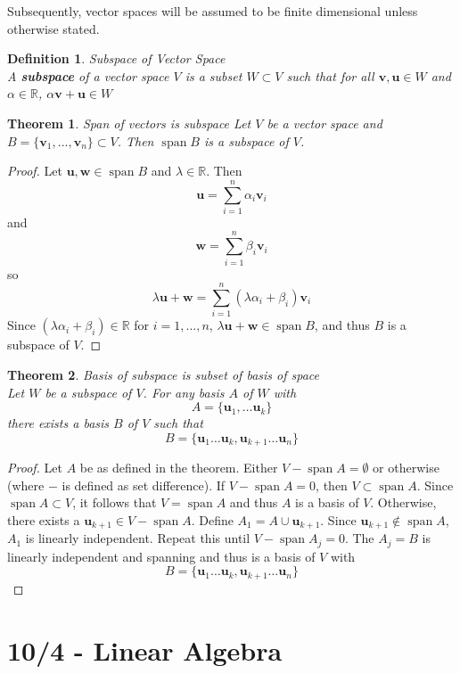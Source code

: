 \documentclass[12pt]{article}
\newtheorem{thm}{Theorem}[section] %
\theoremstyle{plain}
\newtheorem{definition}{Definition}[section]
\newcommand{\R}{\mathbb{R}}
\DeclareMathOperator{\spn}{span}
\newcommand{\vv}{\mathbf{v}}
\newcommand{\vu}{\mathbf{u}}
\newcommand{\vw}{\mathbf{w}}
\begin{document}
    Subsequently, vector spaces will be assumed to be finite dimensional unless otherwise stated.

    \begin{definition}{Subspace of Vector Space}
        ~\\A \textbf{subspace} of a vector space $V$ is a subset $W \subset V$ such that for all $\vv, \vu \in W$ and $\alpha \in \R$, $\alpha \vv + \vu \in W$
    \end{definition}

    \begin{thm}{Span of vectors is subspace}
        Let $V$ be a vector space and $B = \{\vv_1, \dots, \vv_n\} \subset V$. Then $\spn B$ is a subspace of $V$.
    \end{thm}

    \begin{proof}
        Let $\vu, \vw \in \spn B$ and $\lambda \in \R$. Then $$\vu = \sum_{i = 1}^n \alpha_i \vv_i$$and$$\vw = \sum_{i = 1}^n \beta_i \vv_i$$so$$\lambda\vu + \vw = \sum_{i = 1}^n (\lambda\alpha_i + \beta_i) \vv_i$$Since $(\lambda\alpha_i + \beta_i) \in \R$ for $i = 1, \dots, n$, $\lambda \vu + \vw \in \spn B$, and thus $B$ is a subspace of $V$.
    \end{proof}

    \begin{thm}{Basis of subspace is subset of basis of space}
        ~\\Let $W$ be a subspace of $V$. For any basis $A$ of $W$ with $$A = \{\vu_1, \dots \vu_k\}$$there exists a basis $B$ of $V$ such that $$B = \{\vu_1 \dots \vu_k, \vu_{k+1} \dots \vu_n \}$$
    \end{thm}

    \begin{proof}
        Let $A$ be as defined in the theorem. Either $V - \spn A = \emptyset$ or otherwise (where $-$ is defined as set difference). If $V - \spn A = 0$, then $V \subset \spn A$. Since $\spn A \subset V$, it follows that $V = \spn A$ and thus $A$ is a basis of $V$. Otherwise, there exists a $\vu_{k+1} \in V - \spn A$. Define $A_1 = A \cup \vu_{k+1}$. Since $\vu_{k+1} \not\in \spn A$, $A_1$ is linearly independent. Repeat this until $V - \spn A_j = 0$. The $A_j = B$ is linearly independent and spanning and thus is a basis of $V$ with $$B = \{\vu_1 \dots \vu_k, \vu_{k+1} \dots \vu_n \}$$
    \end{proof}

    \section[d2]{10/4 - Linear Algebra}
\end{document}
